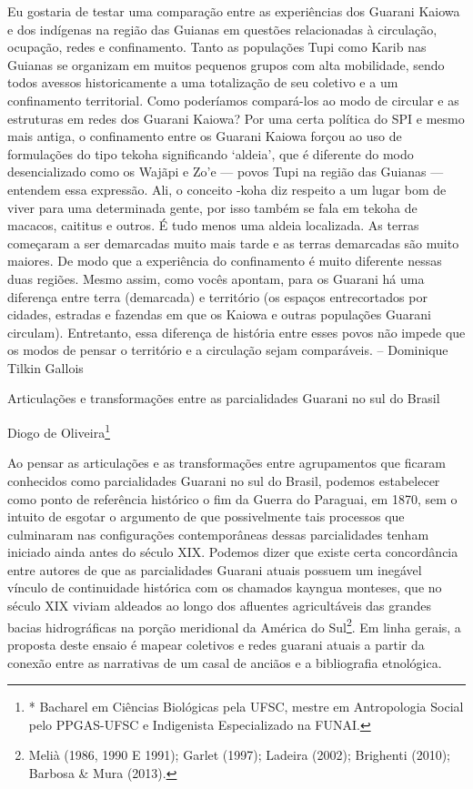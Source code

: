 \documentclass{article}
\begin{document}
Eu gostaria de testar uma compara\c{c}\~ao entre as experi\^encias dos
Guarani Kaiowa e dos ind\'igenas na regi\~ao das Guianas em quest\~oes
relacionadas \`a circula\c{c}\~ao, ocupa\c{c}\~ao, redes e
confinamento. Tanto as popula\c{c}\~oes Tupi como Karib nas Guianas se
organizam em muitos pequenos grupos com alta mobilidade, sendo todos
avessos historicamente a uma totaliza\c{c}\~ao de seu coletivo e a um
confinamento territorial. Como poder\'iamos compar\'a-los ao modo de
circular e as estruturas em redes dos Guarani Kaiowa? Por uma certa
pol\'itica do SPI e mesmo mais antiga, o confinamento entre os Guarani
Kaiowa for\c{c}ou ao uso de formula\c{c}\~oes do tipo tekoha
significando {\textquoteleft}aldeia{\textquoteright}, que \'e diferente
do modo desencializado como os Waj\~api e Zo{\textquoteright}e {}---
povos Tupi na regi\~ao das Guianas {}--- entendem essa express\~ao.
Ali, o conceito -koha diz respeito a um lugar bom de viver para uma
determinada gente, por isso tamb\'em se fala em tekoha de macacos,
caititus e outros. \'E tudo menos uma aldeia localizada. As terras
come\c{c}aram a ser demarcadas muito mais tarde e as terras demarcadas
s\~ao muito maiores. De modo que a experi\^encia do confinamento \'e
muito diferente nessas duas regi\~oes. Mesmo assim, como voc\^es
apontam, para os Guarani h\'a uma diferen\c{c}a entre terra (demarcada)
e territ\'orio (os espa\c{c}os entrecortados por cidades, estradas e
fazendas em que os Kaiowa e outras popula\c{c}\~oes Guarani circulam).
Entretanto, essa diferen\c{c}a de hist\'oria entre esses povos n\~ao
impede que os modos de pensar o territ\'orio e a circula\c{c}\~ao sejam
compar\'aveis. -- Dominique Tilkin Gallois

Articula\c{c}\~oes e transforma\c{c}\~oes entre as parcialidades Guarani
no sul do Brasil

Diogo de Oliveira\footnote{* Bacharel em Ci\^encias Biol\'ogicas pela
UFSC, mestre em Antropologia Social pelo PPGAS-UFSC e Indigenista
Especializado na FUNAI.} 

Ao pensar as articula\c{c}\~oes e as transforma\c{c}\~oes entre
agrupamentos que ficaram conhecidos como parcialidades Guarani no sul
do Brasil, podemos estabelecer como ponto de refer\^encia hist\'orico o
fim da Guerra do Paraguai, em 1870, sem o intuito de esgotar o
argumento de que possivelmente tais processos que culminaram nas
configura\c{c}\~oes contempor\^aneas dessas parcialidades tenham
iniciado ainda antes do s\'eculo XIX. Podemos dizer que existe certa
concord\^ancia entre autores de que as parcialidades Guarani atuais
possuem um ineg\'avel v\'inculo de continuidade hist\'orica com os
chamados kayngua monteses, que no s\'eculo XIX viviam aldeados ao longo
dos afluentes agricult\'aveis das grandes bacias hidrogr\'aficas na
por\c{c}\~ao meridional da Am\'erica do Sul\footnote{ Meli\`a (1986,
1990 E 1991); Garlet (1997); Ladeira (2002); Brighenti (2010); Barbosa
\& Mura (2013).}. Em linha gerais, a proposta deste ensaio \'e mapear
coletivos e redes guarani atuais a partir da conex\~ao entre as
narrativas de um casal de anci\~aos e a bibliografia etnol\'ogica. 
\end{document}
